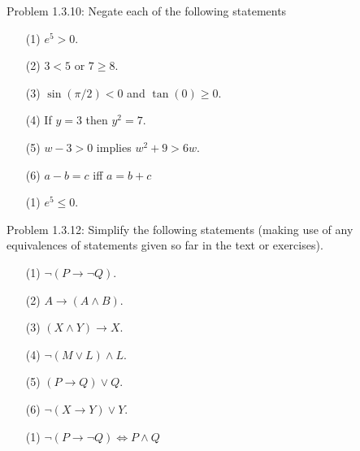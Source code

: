 \documentclass{article}
\theoremstyle{definition}
\begin{document}
	\vspace{.5cm}


	\noindent Problem 1.3.10: Negate each of the following statements
	\begin{itemize}
		\item[(1)] $e^5>0.$
		\item[(2)] $3<5$ or $7\ge 8.$
		\item[(3)] $\sin(\pi/2)<0$ and $\tan(0)\ge 0.$
		\item[(4)] If $y=3$ then $y^2=7.$
		\item[(5)] $w-3>0$ implies $w^2+9>6w.$
		\item[(6)] $a-b=c$ iff $a=b+c$
	\end{itemize}

	\vspace{0.25cm}
	\begin{itemize}
		\item[(1)] $e^5\le 0.$
	\end{itemize}

	\vspace{.5cm}


	\noindent Problem 1.3.12: Simplify the following statements (making use of any equivalences of statements given so far in the text or exercises).
	\begin{itemize}
		\item[(1)] $\neg(P\rightarrow \neg Q).$
		\item[(2)] $A\rightarrow (A\wedge B).$
		\item[(3)] $(X\wedge Y)\rightarrow X.$
		\item[(4)] $\neg(M\vee L)\wedge L.$
		\item[(5)] $(P\rightarrow Q)\vee Q.$
		\item[(6)] $\neg(X\rightarrow Y)\vee Y.$
	\end{itemize}

	\vspace{0.25cm}
	\begin{itemize}
		\item[(1)] $\neg(P\rightarrow \neg Q)\Leftrightarrow P\wedge Q$
	\end{itemize}

	\vspace{.5cm}

\end{document}
